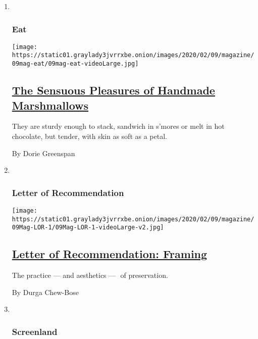\begin{enumerate}
\def\labelenumi{\arabic{enumi}.}
\item ~
  \hypertarget{eat}{%
  \subsubsection{Eat}\label{eat}}

  \texttt{[image: https://static01.graylady3jvrrxbe.onion/images/2020/02/09/magazine/09mag-eat/09mag-eat-videoLarge.jpg]}

  \hypertarget{the-sensuous-pleasures-of-handmade-marshmallows}{%
  \subsection{\texorpdfstring{\href{/2020/02/05/magazine/marshmallow-recipe.html}{The
  Sensuous Pleasures of Handmade
  Marshmallows}}{The Sensuous Pleasures of Handmade Marshmallows}}\label{the-sensuous-pleasures-of-handmade-marshmallows}}

  They are sturdy enough to stack, sandwich in s'mores or melt in hot
  chocolate, but tender, with skin as soft as a petal.

  By Dorie Greenspan
\item ~
  \hypertarget{letter-of-recommendation}{%
  \subsubsection{Letter of
  Recommendation}\label{letter-of-recommendation}}

  \texttt{[image: https://static01.graylady3jvrrxbe.onion/images/2020/02/09/magazine/09Mag-LOR-1/09Mag-LOR-1-videoLarge-v2.jpg]}

  \hypertarget{letter-of-recommendation-framing}{%
  \subsection{\texorpdfstring{\href{/2020/02/04/magazine/letter-of-recommendation-framing.html}{Letter
  of Recommendation:
  Framing}}{Letter of Recommendation: Framing}}\label{letter-of-recommendation-framing}}

  The practice --- and aesthetics ---  of preservation.

  By Durga Chew-Bose
\item ~
  \hypertarget{screenland}{%
  \subsubsection{Screenland}\label{screenland}}


\end{enumerate}
